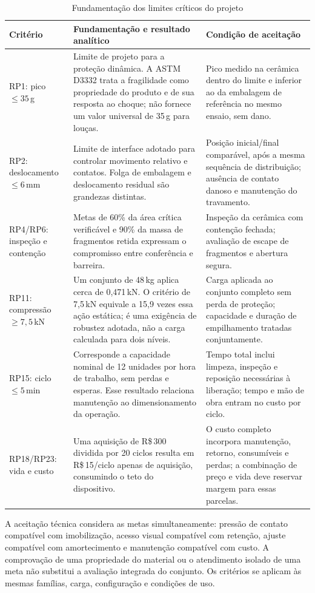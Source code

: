 \begin{table}[H]
\caption{Fundamentação dos limites críticos do projeto}
\label{tab:fundamentacao-limites}
\centering\footnotesize
\begin{tabularx}{\textwidth}{L{2.4cm}YL{5.2cm}}
\toprule\textbf{Critério}&\textbf{Fundamentação e resultado analítico}&\textbf{Condição de aceitação}\\\midrule
RP1: pico $\leq35$\,g&Limite de projeto para a proteção dinâmica. A ASTM D3332 trata a fragilidade como propriedade do produto e de sua resposta ao choque; não fornece um valor universal de 35\,g para louças.&Pico medido na cerâmica dentro do limite e inferior ao da embalagem de referência no mesmo ensaio, sem dano.\\
RP2: deslocamento $\leq6$\,mm&Limite de interface adotado para controlar movimento relativo e contatos. Folga de embalagem e deslocamento residual são grandezas distintas.&Posição inicial/final comparável, após a mesma sequência de distribuição; ausência de contato danoso e manutenção do travamento.\\
RP4/RP6: inspeção e contenção&Metas de 60\% da área crítica verificável e 90\% da massa de fragmentos retida expressam o compromisso entre conferência e barreira.&Inspeção da cerâmica com contenção fechada; avaliação de escape de fragmentos e abertura segura.\\
RP11: compressão $\geq7{,}5$\,kN&Um conjunto de 48\,kg aplica cerca de 0,471\,kN. O critério de 7,5\,kN equivale a 15,9 vezes essa ação estática; é uma exigência de robustez adotada, não a carga calculada para dois níveis.&Carga aplicada ao conjunto completo sem perda de proteção; capacidade e duração de empilhamento tratadas conjuntamente.\\
RP15: ciclo $\leq5$\,min&Corresponde a capacidade nominal de 12 unidades por hora de trabalho, sem perdas e esperas. Esse resultado relaciona manutenção ao dimensionamento da operação.&Tempo total inclui limpeza, inspeção e reposição necessárias à liberação; tempo e mão de obra entram no custo por ciclo.\\
RP18/RP23: vida e custo&Uma aquisição de R\$\,300 dividida por 20 ciclos resulta em R\$\,15/ciclo apenas de aquisição, consumindo o teto do dispositivo.&O custo completo incorpora manutenção, retorno, consumíveis e perdas; a combinação de preço e vida deve reservar margem para essas parcelas.\\
\bottomrule\end{tabularx}
\end{table}

A aceitação técnica considera as metas simultaneamente: pressão de contato compatível com imobilização, acesso visual compatível com retenção, ajuste compatível com amortecimento e manutenção compatível com custo. A comprovação de uma propriedade do material ou o atendimento isolado de uma meta não substitui a avaliação integrada do conjunto. Os critérios se aplicam às mesmas famílias, carga, configuração e condições de uso.
